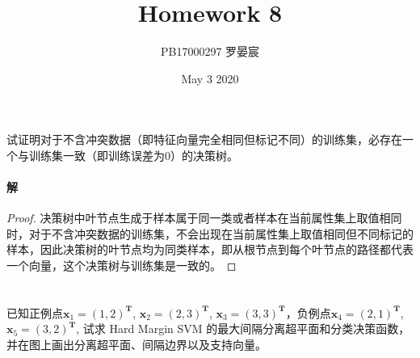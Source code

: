 \documentclass{article}
\title{Homework 8}
\author{PB17000297 罗晏宸}
\date{May 3 2020}
\begin{document}
\maketitle

\section{}
试证明对于不含冲突数据（即特征向量完全相同但标记不同）的训练集，必存在一个与训练集一致（即训练误差为0）的决策树。

\paragraph{解}
\begin{proof}
    决策树中叶节点生成于样本属于同一类或者样本在当前属性集上取值相同时，对于不含冲突数据的训练集，不会出现在当前属性集上取值相同但不同标记的样本，因此决策树的叶节点均为同类样本，即从根节点到每个叶节点的路径都代表一个向量，这个决策树与训练集是一致的。
\end{proof}

\section{}
已知正例点$\boldsymbol{x}_1 = (1, 2)^\mathbf{T}$, $\boldsymbol{x}_2 = (2, 3)^\mathbf{T}$, $\boldsymbol{x}_3 = (3, 3)^\mathbf{T}$，负例点$\boldsymbol{x}_4 = (2, 1)^\mathbf{T}$, $\boldsymbol{x}_5 = (3, 2)^\mathbf{T}$, 试求 Hard Margin SVM 的最大间隔分离超平面和分类决策函数，并在图上画出分离超平面、间隔边界以及支持向量。
\end{document}
